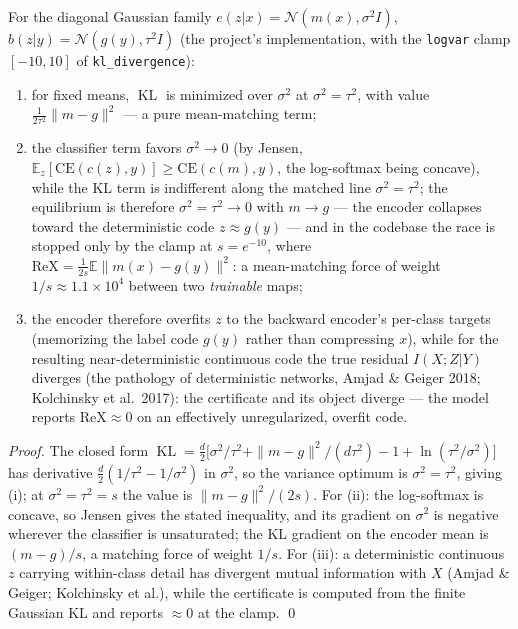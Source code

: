 \begin{proposition}\label{prop:variance}
For the diagonal Gaussian family $e(z|x) = \mathcal{N}(m(x), \sigma^2 I)$,
$b(z|y) = \mathcal{N}(g(y), \tau^2 I)$ (the project's implementation, with the
\texttt{logvar} clamp $[-10, 10]$ of \texttt{kl\_divergence}):
\begin{enumerate}
\item[(i)] for fixed means, $\operatorname{KL}$ is minimized over $\sigma^2$ at
$\sigma^2 = \tau^2$, with value $\tfrac{1}{2\tau^2}\|m - g\|^2$ --- a pure mean-matching
term;
\item[(ii)] the classifier term favors $\sigma^2 \to 0$ (by Jensen,
$\mathbb{E}_z[\mathrm{CE}(c(z), y)] \ge \mathrm{CE}(c(m), y)$, the log-softmax being
concave), while the KL term is indifferent along the matched line $\sigma^2 = \tau^2$;
the equilibrium is therefore $\sigma^2 = \tau^2 \to 0$ with $m \to g$ --- the encoder
collapses toward the deterministic code $z \approx g(y)$ --- and in the codebase the race
is stopped only by the clamp at $s = e^{-10}$, where
$\mathrm{ReX} = \tfrac{1}{2s}\mathbb{E}\|m(x) - g(y)\|^2$: a mean-matching force of
weight $1/s \approx 1.1\times10^{4}$ between two \emph{trainable} maps;
\item[(iii)] the encoder therefore overfits $z$ to the backward encoder's per-class
targets (memorizing the label code $g(y)$ rather than compressing $x$), while for the
resulting near-deterministic continuous code the true residual $I(X;Z|Y)$ diverges (the
pathology of deterministic networks, Amjad \& Geiger 2018; Kolchinsky et al.\ 2017): the
certificate and its object diverge --- the model reports $\mathrm{ReX} \approx 0$ on an
effectively unregularized, overfit code.
\end{enumerate}
\end{proposition}

\begin{proof}
The closed form
$\operatorname{KL} = \tfrac{d}{2}\big[\sigma^2/\tau^2 + \|m-g\|^2/(d\tau^2)
- 1 + \ln(\tau^2/\sigma^2)\big]$ has derivative $\tfrac{d}{2}(1/\tau^2 - 1/\sigma^2)$
in $\sigma^2$, so the variance optimum is $\sigma^2 = \tau^2$, giving (i); at
$\sigma^2 = \tau^2 = s$ the value is $\|m-g\|^2/(2s)$. For (ii): the log-softmax is
concave, so Jensen gives the stated inequality, and its gradient on $\sigma^2$ is
negative wherever the classifier is unsaturated; the KL gradient on the encoder mean is
$(m - g)/s$, a matching force of weight $1/s$. For (iii): a deterministic continuous $z$
carrying within-class detail has divergent mutual information with $X$ (Amjad \& Geiger;
Kolchinsky et al.), while the certificate is computed from the finite Gaussian KL and
reports $\approx 0$ at the clamp. \hfill\qed
\end{proof}

